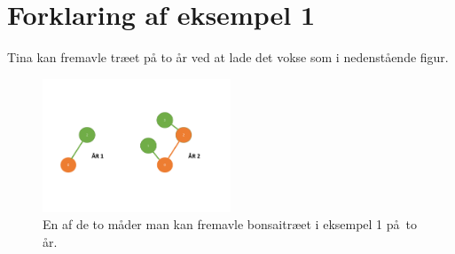 \section*{Forklaring af eksempel 1}
Tina kan fremavle træet på to år ved at lade det vokse som i nedenstående figur.

\begin{figure}[h]
	\centering
\includegraphics[width=0.5\textwidth]{Bonsai_tree}
\caption{En af de to måder man kan fremavle bonsaitræet i eksempel  1 på to år.}
\end{figure}
